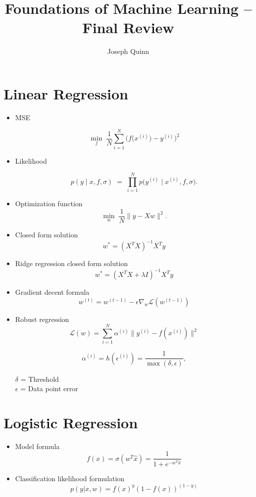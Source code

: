 \documentclass[11pt]{article}
\title{Foundations of Machine Learning -- Final Review}
\author{Joseph Quinn}
\date{}
\begin{document}
\maketitle

\section{Linear Regression}
\begin{itemize}
	\item MSE

	      \[
		      \min_{f} \; \frac{1}{N} \sum_{i=1}^{N} \Big(f\big(x^{(i)}\big) - y^{(i)}\Big)^2
	      \]
	\item Likelihood

	      \[
		      p(y \mid x, f, \sigma)
		      \;=\;
		      \prod_{i=1}^N p\!\big(y^{(i)} \mid x^{(i)}, f, \sigma\big).
	      \]
	\item Optimization function
	      \[
		      \min_{w} \; \frac{1}{N} \|y - Xw\|^2.
	      \]
	\item Closed form solution
	      \[
		      w^* = (X^T X)^{-1} X^T y
	      \]
	\item Ridge regression closed form solution
	      \[
		      w^* = (X^T X + \lambda I)^{-1} X^T y
	      \]

	\item Gradient decent formula
	      \[
		      w^{(t)} = w^{(t-1)} - \epsilon \nabla_w \mathcal{L}(w^{(t-1)})
	      \]
	\item Robust regression
	      \[
		      \mathcal{L}(w) = \sum_{i=1}^N \alpha^{(i)} \bigl\lVert y^{(i)} - f(x^{(i)}) \bigr\rVert^2
	      \]

	      \[
		      \alpha^{(i)} = h(\epsilon^{(i)})
		      = \frac{1}{\max(\delta, \epsilon)},
	      \]

	      $\delta$ = Threshold \\
	      $\epsilon$ = Data point error

\end{itemize}

\section{Logistic Regression}
\begin{itemize}
	\item Model formula
	      \[
		      f(x) = \sigma(w^T \hat{x}) = \frac{1}{1 + e^{-w^T \hat{x}}}
	      \]
	\item Classification likelihood formulation
	      \[
		      p(y|x,w) = f(x)^y (1 - f(x))^{(1-y)}
	      \]
\end{itemize}
\end{document}

